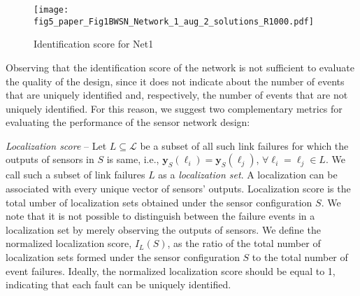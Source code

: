\documentclass[twocolumn]{autart}
\begin{document}
	\begin{figure} 
	\centering
		\texttt{[image: fig5\_paper\_Fig1BWSN\_Network\_1\_aug\_2\_solutions\_R1000.pdf]}       
\caption{\footnotesize Identification score for Net1}   \label{fig:net1_1} 
	\end{figure}

Observing that the identification score of the network is not sufficient to evaluate the quality of the design, since it does not indicate about the number of events that are uniquely identified and, respectively, the number of events that are not uniquely identified. For this reason, we suggest two complementary metrics for evaluating the performance of the sensor network design: \vspace{-0.25cm}

\emph{Localization score} -- Let $L\subseteq\mathcal{L}$ be a subset of all such link failures for which the outputs of sensors in $S$ is same, i.e., $ \mathbf{y}_S(\ell_i) = \mathbf{y}_S(\ell_j)$, $\forall \ell_i=\ell_j \in L$. We call such a subset of link failures $L$ as a \textit{localization set}. A localization can be associated with every unique vector of sensors' outputs. Localization score is the total umber of localization sets obtained under the sensor configuration $S$.  We note that it is not possible to distinguish between the failure events in a localization set by merely observing the outputs of sensors. We define the normalized localization score, $I_L(S)$, as the ratio of the total number of localization sets formed under the sensor configuration $S$ to the total number of event failures. 
Ideally, the normalized localization score should be equal to 1, indicating that each fault can be uniquely identified. 
	
\end{document}
